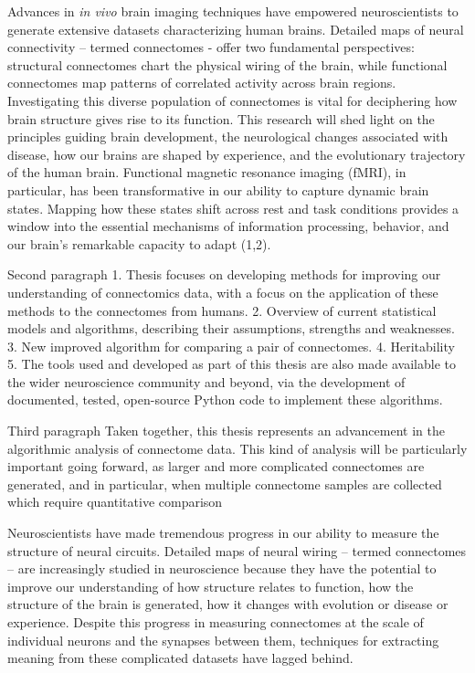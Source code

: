 Advances in \textit{in vivo} brain imaging techniques have empowered neuroscientists to generate extensive datasets characterizing human brains. Detailed maps of neural connectivity – termed connectomes - offer two fundamental perspectives: structural connectomes chart the physical wiring of the brain, while functional connectomes map patterns of correlated activity across brain regions. Investigating this diverse population of connectomes is vital for deciphering how brain structure gives rise to its function. This research will shed light on the principles guiding brain development, the neurological changes associated with disease, how our brains are shaped by experience, and the evolutionary trajectory of the human brain.  Functional magnetic resonance imaging (fMRI), in particular, has been transformative in our ability to capture dynamic brain states. Mapping how these states shift across rest and task conditions provides a window into the essential mechanisms of information processing, behavior, and our brain's remarkable capacity to adapt (1,2).



Second paragraph
1. Thesis focuses on  developing methods for improving our understanding of connectomics data, with a focus on the application of these methods to the connectomes from humans.
2. Overview of current statistical models and algorithms, describing their assumptions, strengths and weaknesses.
3. New improved algorithm for comparing a pair of connectomes.
4. Heritability
5. The tools used and developed as part of this thesis are also made available to the wider neuroscience community and beyond, via the development of documented, tested, open-source Python code to implement these algorithms.

Third paragraph
Taken together, this thesis represents an advancement in the algorithmic analysis
of connectome data. This kind of analysis will be particularly important going forward,
as larger and more complicated connectomes are generated, and in particular, when
multiple connectome samples are collected which require quantitative comparison


Neuroscientists have made tremendous progress in our ability to measure the structure of neural circuits. Detailed maps of neural wiring – termed connectomes – are increasingly studied in neuroscience because they have the potential to improve our understanding of how structure relates to function, how the structure of the brain is generated, how it changes with evolution or disease or experience. Despite this progress in measuring connectomes at the scale of individual neurons and the synapses between them, techniques for extracting meaning from these complicated datasets have lagged behind.

